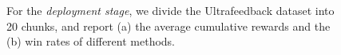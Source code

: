 \begin{figure}
    \begin{minipage}[t]{0.99\textwidth}
        \centering
        \hfill
    \end{minipage}
    \caption{For the \emph{deployment stage}, we divide the Ultrafeedback dataset into 20 chunks, and report (a) the average cumulative rewards and the (b) win rates of different methods.}
    \label{fig:deployment_figures}
\end{figure}
